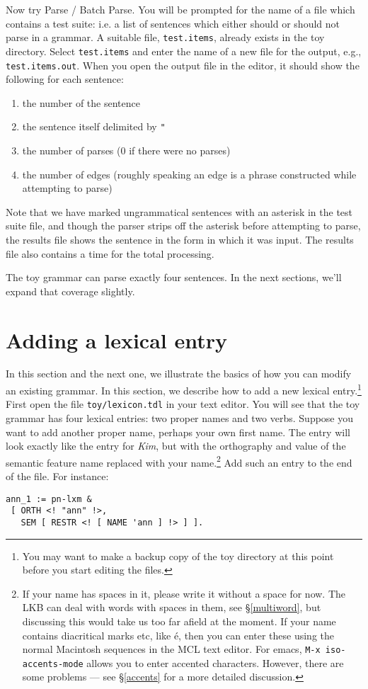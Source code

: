 \documentclass[12pt]{report}
\newcommand{\filename}[1]{{\tt #1}}
\newcommand{\lkbmenucommand}{{\bf}}
\begin{document}
Now try {\lkbmenucommand Parse} / {\lkbmenucommand Batch Parse}.  
You will be prompted for the
name of a file which contains a test suite: i.e. a list of sentences
which either should or should not parse in a grammar.  A suitable file,
\filename{test.items}, already exists in the toy directory.  Select 
\filename{test.items} and enter the name of a new file for the output,
e.g., \filename{test.items.out}.  When you open the output file in
the editor, it should show the following for each sentence:
\begin{enumerate}
\item the number of the sentence
\item the sentence itself delimited by {\tt "}
\item the number of parses (0 if there were no parses)
\item the number of edges (roughly speaking an edge is a
phrase constructed while attempting to parse) 
\end{enumerate}
Note that we have marked ungrammatical sentences with an asterisk
in the test suite file, and though the parser strips off the asterisk before 
attempting to parse, the results file shows the sentence in the
form in which it was input. 
The results file also contains a time for the total processing.

The toy grammar can parse exactly four 
sentences.  In the next sections, we'll expand that coverage slightly.


\section{Adding a lexical entry}

In this section and the next one, we illustrate the basics of how you can
modify an existing grammar.
In this section, we describe how to add a new lexical entry.\footnote{You 
may want to make a backup copy of the toy
directory at this point before you start editing the files.}
First open the file \filename{toy/lexicon.tdl} in your text 
editor.
You will see that
the toy grammar has four lexical entries: two proper names and two verbs.
Suppose you want to add another proper name,
perhaps your own first name.  The entry will look exactly like
the entry for {\it Kim}, but with the orthography and value
of the semantic feature {\feature name} replaced with your name.\footnote{If your name
has spaces in it, please write it without a space for now.  
The LKB can deal with words with spaces in them, see \S\ref{multiword},
but discussing this would take us too far afield at the moment.  If your name contains
diacritical marks etc, like \'{e}, then you can enter these 
using the normal Macintosh sequences 
in the MCL text editor.  For emacs, {\tt M-x iso-accents-mode} allows
you to enter accented characters.  
However, there are some problems --- see \S\ref{accents} for a more
detailed discussion.}
Add such an entry to the end of the file.
For instance:
\begin{verbatim}
ann_1 := pn-lxm & 
 [ ORTH <! "ann" !>,
   SEM [ RESTR <! [ NAME 'ann ] !> ] ].
\end{verbatim}
\end{document}
